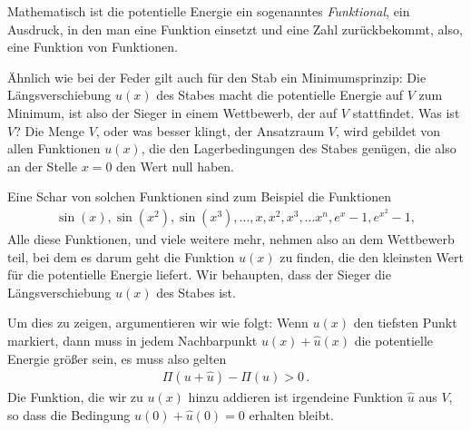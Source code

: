 Mathematisch ist die potentielle Energie ein sogenanntes {\em Funktional\/}, ein Ausdruck, in den man eine Funktion einsetzt und eine Zahl zur\"{u}ckbekommt, also, eine Funktion von Funktionen.

\"{A}hnlich wie bei der Feder gilt auch f\"{u}r den Stab ein Minimumsprinzip: Die L\"{a}ngsverschiebung $ u(x) $ des Stabes macht die potentielle Energie auf $V$ zum Minimum, ist also der Sieger in einem Wettbewerb, der auf $ V $ stattfindet. Was ist $V$? Die Menge $V$, oder was besser klingt, der Ansatzraum $V$, wird gebildet von allen Funktionen $ u(x)$, die den Lagerbedingungen des Stabes gen\"{u}gen, die also an der Stelle $ x = 0$ den Wert null haben.

Eine Schar von solchen Funktionen sind zum Beispiel die Funktionen
\begin{align}\label{Eq6}
\sin(x), \sin(x^2), \sin(x^3), \ldots, x, x^2, x^3, \ldots x^n, e^x - 1, e^{x^2} - 1,
\end{align}
Alle diese Funktionen, und viele weitere mehr, nehmen also an dem Wettbewerb teil, bei dem es darum geht die Funktion $u(x)$ zu finden, die den kleinsten Wert f\"{u}r die potentielle Energie liefert. Wir behaupten, dass der Sieger die L\"{a}ngsverschiebung $u(x)$ des Stabes ist.

Um dies zu zeigen, argumentieren wir wie folgt: Wenn $u(x)$ den tiefsten Punkt markiert, dann muss in jedem Nachbarpunkt  $u(x) + \hat{u}(x)$ die potentielle Energie gr\"{o}{\ss}er sein, es muss also gelten
\begin{align} \label{Eq7}
\Pi(u + \hat{u}) - \Pi(u) > 0\,.
\end{align}
Die Funktion, die wir zu $ u(x) $ hinzu addieren ist irgendeine Funktion $\hat{u}$ aus $V$, so dass die Bedingung $u(0) + \hat{u}(0) = 0 $ erhalten bleibt.

